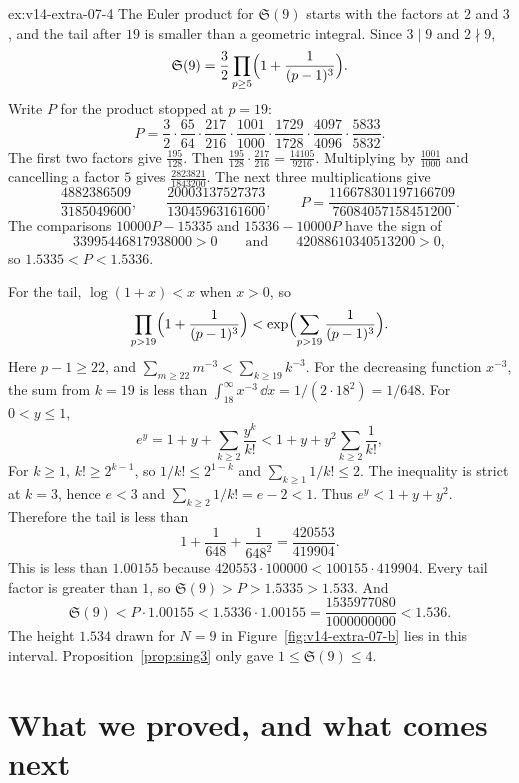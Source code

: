 \begin{solution}{ex:v14-extra-07-4}
\idea The Euler product for $\mathfrak S(9)$ starts with the factors at $2$ and $3$, and the tail after $19$ is smaller than a geometric integral.
\writeup Since $3\mid9$ and $2\nmid9$,
\[
\mathfrak S(9)=\frac32\prod_{p\ge5}\Bigl(1+\frac1{(p-1)^3}\Bigr).
\]
Write $P$ for the product stopped at $p=19$:
\[
P=\frac32\cdot\frac{65}{64}\cdot\frac{217}{216}\cdot\frac{1001}{1000}\cdot\frac{1729}{1728}\cdot\frac{4097}{4096}\cdot\frac{5833}{5832}.
\]
The first two factors give $\frac{195}{128}$. Then $\frac{195}{128}\cdot\frac{217}{216}=\frac{14105}{9216}$. Multiplying by $\frac{1001}{1000}$ and cancelling a factor $5$ gives $\frac{2823821}{1843200}$. The next three multiplications give
\[
\frac{4882386509}{3185049600},\qquad
\frac{20003137527373}{13045963161600},\qquad
P=\frac{116678301197166709}{76084057158451200}.
\]
The comparisons $10000P-15335$ and $15336-10000P$ have the sign of
\[
33995446817938000>0\qquad\text{and}\qquad42088610340513200>0,
\]
so $1.5335<P<1.5336$.

For the tail, $\log(1+x)<x$ when $x>0$, so
\[
\prod_{p>19}\Bigl(1+\frac1{(p-1)^3}\Bigr)<\exp\Bigl(\sum_{p>19}\frac1{(p-1)^3}\Bigr).
\]
Here $p-1\ge22$, and $\sum_{m\ge22}m^{-3}<\sum_{k\ge19}k^{-3}$. For the decreasing function $x^{-3}$, the sum from $k=19$ is less than $\int_{18}^\infty x^{-3}\,\dd x=1/(2\cdot18^2)=1/648$. For $0<y\le1$,
\[
e^y=1+y+\sum_{k\ge2}\frac{y^k}{k!}<1+y+y^2\sum_{k\ge2}\frac1{k!},
\]
For $k\ge1$, $k!\ge2^{k-1}$, so $1/k!\le2^{1-k}$ and $\sum_{k\ge1}1/k!\le2$. The inequality is strict at $k=3$, hence $e<3$ and $\sum_{k\ge2}1/k!=e-2<1$. Thus $e^y<1+y+y^2$. Therefore the tail is less than
\[
1+\frac1{648}+\frac1{648^2}=\frac{420553}{419904}.
\]
This is less than $1.00155$ because $420553\cdot100000<100155\cdot419904$. Every tail factor is greater than $1$, so $\mathfrak S(9)>P>1.5335>1.533$. And
\[
\mathfrak S(9)<P\cdot1.00155<1.5336\cdot1.00155=\frac{1535977080}{1000000000}<1.536.
\]
The height $1.534$ drawn for $N=9$ in Figure~\ref{fig:v14-extra-07-b} lies in this interval. Proposition~\ref{prop:sing3} only gave $1\le\mathfrak S(9)\le4$.
\end{solution}

\section{What we proved, and what comes next}

